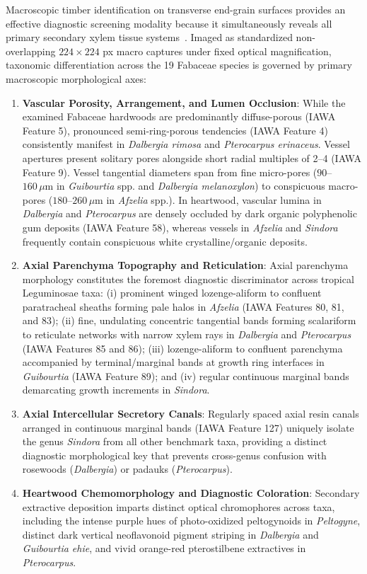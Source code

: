 \documentclass[a4paper,fleqn,12pt]{cas-sc}
\begin{document}
Macroscopic timber identification on transverse end-grain surfaces provides an effective diagnostic screening modality because it simultaneously reveals all primary secondary xylem tissue systems~\cite{wiedenhoeft2011}. Imaged as standardized non-overlapping $224 \times 224$ px macro captures under fixed optical magnification, taxonomic differentiation across the 19 Fabaceae species is governed by primary macroscopic morphological axes:
\begin{enumerate}[leftmargin=*,itemsep=2pt,topsep=2pt]
    \item \textbf{Vascular Porosity, Arrangement, and Lumen Occlusion}: While the examined Fabaceae hardwoods are predominantly diffuse-porous (IAWA Feature 5), pronounced semi-ring-porous tendencies (IAWA Feature 4) consistently manifest in \textit{Dalbergia rimosa} and \textit{Pterocarpus erinaceus}. Vessel apertures present solitary pores alongside short radial multiples of 2--4 (IAWA Feature 9). Vessel tangential diameters span from fine micro-pores ($90$--$160\,\mu\text{m}$ in \textit{Guibourtia} spp. and \textit{Dalbergia melanoxylon}) to conspicuous macro-pores ($180$--$260\,\mu\text{m}$ in \textit{Afzelia} spp.). In heartwood, vascular lumina in \textit{Dalbergia} and \textit{Pterocarpus} are densely occluded by dark organic polyphenolic gum deposits (IAWA Feature 58), whereas vessels in \textit{Afzelia} and \textit{Sindora} frequently contain conspicuous white crystalline/organic deposits.
    \item \textbf{Axial Parenchyma Topography and Reticulation}: Axial parenchyma morphology constitutes the foremost diagnostic discriminator across tropical Leguminosae taxa: (i) prominent winged lozenge-aliform to confluent paratracheal sheaths forming pale halos in \textit{Afzelia} (IAWA Features 80, 81, and 83); (ii) fine, undulating concentric tangential bands forming scalariform to reticulate networks with narrow xylem rays in \textit{Dalbergia} and \textit{Pterocarpus} (IAWA Features 85 and 86); (iii) lozenge-aliform to confluent parenchyma accompanied by terminal/marginal bands at growth ring interfaces in \textit{Guibourtia} (IAWA Feature 89); and (iv) regular continuous marginal bands demarcating growth increments in \textit{Sindora}.
    \item \textbf{Axial Intercellular Secretory Canals}: Regularly spaced axial resin canals arranged in continuous marginal bands (IAWA Feature 127) uniquely isolate the genus \textit{Sindora} from all other benchmark taxa, providing a distinct diagnostic morphological key that prevents cross-genus confusion with rosewoods (\textit{Dalbergia}) or padauks (\textit{Pterocarpus}).
    \item \textbf{Heartwood Chemomorphology and Diagnostic Coloration}: Secondary extractive deposition imparts distinct optical chromophores across taxa, including the intense purple hues of photo-oxidized peltogynoids in \textit{Peltogyne}, distinct dark vertical neoflavonoid pigment striping in \textit{Dalbergia} and \textit{Guibourtia ehie}, and vivid orange-red pterostilbene extractives in \textit{Pterocarpus}.
\end{enumerate}
\end{document}
